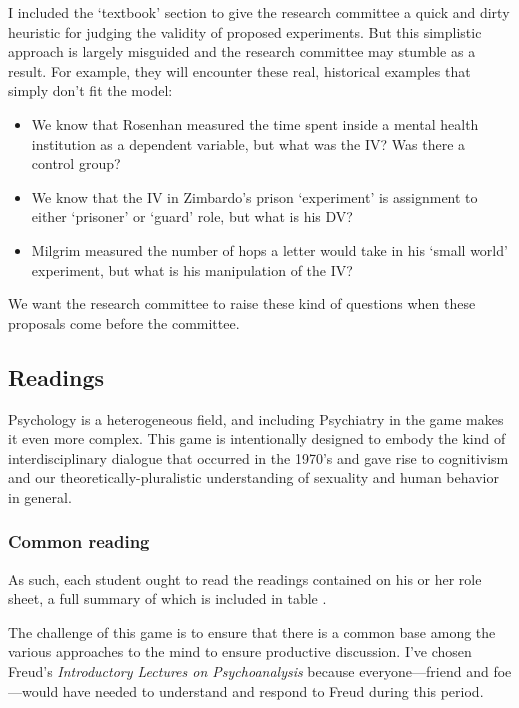 \begin{refsection}
I included the ‘textbook’ section to give the research committee a quick and dirty heuristic for judging the validity of proposed experiments. But this simplistic approach is largely misguided and the research committee may stumble as a result. For example, they will encounter these real, historical examples that simply don’t fit the model:

\begin{itemize}
\item We know that Rosenhan measured the time spent inside a mental health institution as a dependent variable, but what was the IV? Was there a control group?

\item We know that the IV in Zimbardo’s prison ‘experiment’ is assignment to either ‘prisoner’ or ‘guard’ role, but what is his DV?

\item Milgrim measured the number of hops a letter would take in his ‘small world’ experiment, but what is his manipulation of the IV?

\end{itemize}

We want the research committee to raise these kind of questions when these proposals come before the committee. 

\subsection{Readings}
\label{readings}

Psychology is a heterogeneous field, and including Psychiatry in the game makes it even more complex. This game is intentionally designed to embody the kind of interdisciplinary dialogue that occurred in the 1970’s and gave rise to cognitivism and our theoretically-pluralistic understanding of sexuality and human behavior in general. 

\subsubsection{Common reading}
\label{commonreading}

As such, each student ought to read the readings contained on his or her role sheet, a full summary of which is included in table .

The challenge of this game is to ensure that there is a common base among the various approaches to the mind to ensure productive discussion. I’ve chosen Freud’s \emph{Introductory Lectures on Psychoanalysis} because everyone---friend and foe---would have needed to understand and respond to Freud during this period. 


\end{refsection}
